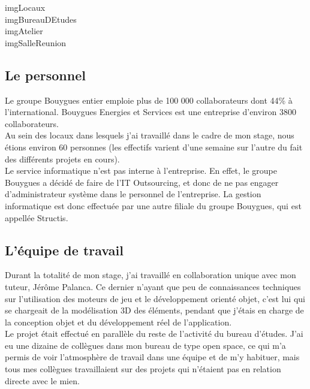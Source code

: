 \documentclass[a4paper]{article}
\begin{document}
    imgLocaux \\
    imgBureauDEtudes \\
    imgAtelier \\
    imgSalleReunion \\

    \subsection{Le personnel}

    Le groupe Bouygues entier emploie plus de 100 000 collaborateurs dont 44\% à l’international. Bouygues Energies et Services est une entreprise d'environ 3800 collaborateurs. \\

    Au sein des locaux dans lesquels j'ai travaillé dans le cadre de mon stage, nous étions environ 60 personnes (les effectifs varient d'une semaine sur l'autre du fait des différents projets en cours).  \\

    Le service informatique n'est pas interne à l'entreprise. En effet, le groupe Bouygues a décidé de faire de l'IT Outsourcing, et donc de ne pas engager d'administrateur système dans le personnel de l'entreprise. La gestion informatique est donc effectuée par une autre filiale du groupe Bouygues, qui est appellée Structis. \\

    \subsection{L'équipe de travail}

    Durant la totalité de mon stage, j'ai travaillé en collaboration unique avec mon tuteur, Jérôme Palanca. Ce dernier n'ayant que peu de connaissances techniques sur l'utilisation des moteurs de jeu et le développement orienté objet, c'est lui qui se chargeait de la modélisation 3D des éléments, pendant que j'étais en charge de la conception objet et du développement réel de l'application. \\
    
    Le projet était effectué en parallèle du reste de l'activité du bureau d'études. J'ai eu une dizaine de collègues dans mon bureau de type open space, ce qui m'a permis de voir l'atmosphère de travail dans une équipe et de m'y habituer, mais tous mes collègues travaillaient sur des projets qui n'étaient pas en relation directe avec le mien. \\
    
\end{document}
